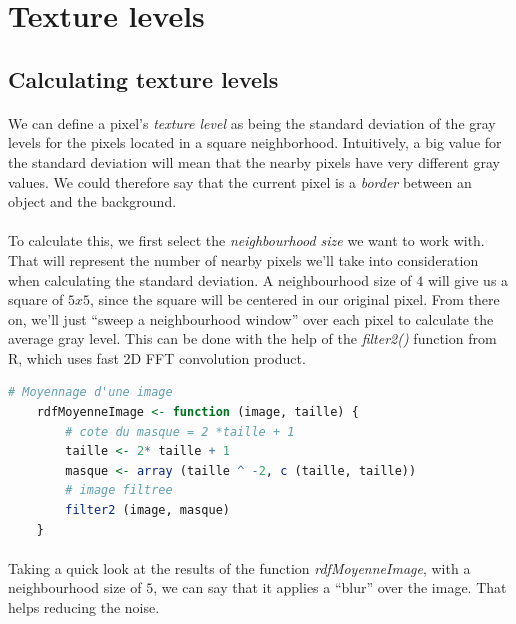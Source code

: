 \clearpage

\section{Texture levels}
\subsection{Calculating texture levels}
\paragraph{}
We can define a pixel's \emph{texture level} as being the standard deviation of the gray levels for the pixels located in a square neighborhood.
Intuitively, a big value for the standard deviation will mean that the nearby pixels have very different gray values.
We could therefore say that the current pixel is a \emph{border} between an object and the background.
\paragraph{}
To calculate this, we first select the \emph{neighbourhood size} we want to work with.
That will represent the number of nearby pixels we'll take into consideration when calculating the standard deviation.
A neighbourhood size of $4$ will give us a square of $5x5$, since the square will be centered in our original pixel.
From there on, we'll just ``sweep a neighbourhood window'' over each pixel to calculate the average gray level.
This can be done with the help of the \emph{filter2()} function from R, which uses fast 2D FFT convolution product. \cite{r_filter2_doc}

\begin{lstlisting}[language=R, caption=Calculating a pixel's average value]
    # Moyennage d'une image
    rdfMoyenneImage <- function (image, taille) {
        # cote du masque = 2 *taille + 1
        taille <- 2* taille + 1
        masque <- array (taille ^ -2, c (taille, taille))
        # image filtree
        filter2 (image, masque)
    }
\end{lstlisting}

\paragraph{}
Taking a quick look at the results of the function \emph{rdfMoyenneImage}, with a neighbourhood size of $5$, we can say that it applies a ``blur'' over the image.
That helps reducing the noise.

